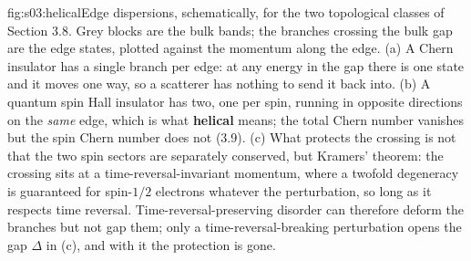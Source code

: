 %
\begin{aqmfigure}{fig:s03:helical}{Edge dispersions, schematically, for the two topological classes
of Section 3.8. Grey blocks are the bulk bands; the branches crossing the bulk gap are the edge
states, plotted against the momentum along the edge. (a) A Chern insulator has a single branch per
edge: at any energy in the gap there is one state and it moves one way, so a scatterer has nothing
to send it back into. (b) A quantum spin Hall insulator has two, one per spin, running in opposite
directions on the \emph{same} edge, which is what \textbf{helical} means; the total Chern number
vanishes but the spin Chern number does not (3.9). (c) What protects the crossing is not that the
two spin sectors are separately conserved, but Kramers' theorem: the crossing sits at a
time-reversal-invariant momentum, where a twofold degeneracy is guaranteed for spin-$1/2$ electrons
whatever the perturbation, so long as it respects time reversal. Time-reversal-preserving disorder
can therefore deform the branches but not gap them; only a time-reversal-breaking perturbation opens
the gap $\Delta$ in (c), and with it the protection is gone.}

\end{aqmfigure}
